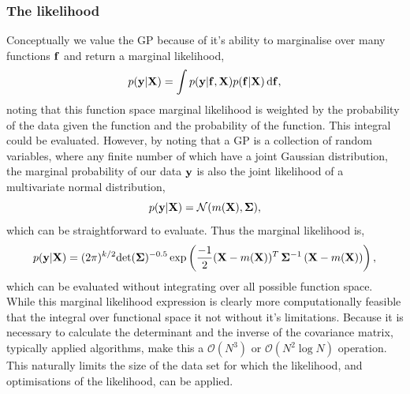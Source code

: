 \subsubsection{The likelihood}
Conceptually we value the GP because of it's ability to marginalise over many functions $\bf f$ and return a marginal likelihood,
\begin{equation}
p({\bf y} | {\bf X}) = \int p({\bf y} | {\bf f}, {\bf X}) p({\bf f} | {\bf X}) \, {\rm d}{\bf f},
\end{equation}
noting that this function space marginal likelihood is weighted by the probability of the data given the function and the probability of the function.  This integral could be evaluated.  However, by noting that a GP is a collection of random variables, where any finite number of which have a joint Gaussian distribution, the marginal probability of our data $\bf y$ is also the joint likelihood of a multivariate normal distribution,
\begin{equation}
p({\bf y} | {\bf X}) = \mathcal{N}(m({\bf X}), {\bf \Sigma}),
\end{equation}
which can be straightforward to evaluate.  Thus the marginal likelihood is,
\begin{equation}
p({\bf y} | {\bf X}) = (2 \pi)^{k/2} {\rm det} ({\bf \Sigma})^{-0.5} \exp \left(\frac{-1}{2} ({\bf X} - m({\bf X}))^{T} \, {\bf \Sigma}^{-1} \, ({\bf X} - m({\bf X})) \right),
\end{equation}
which can be evaluated without integrating over all possible function space.   While this marginal likelihood expression is clearly more computationally feasible that the integral over functional space it not without it's limitations.  Because it is necessary to calculate the determinant and the inverse of the covariance matrix, typically applied algorithms,  make this a $\mathcal{O}(N^3)$ or $\mathcal{O}(N^2 \log N)$ operation.  This naturally limits the size of the data set for which the likelihood,  and optimisations of the likelihood, can be applied.  

